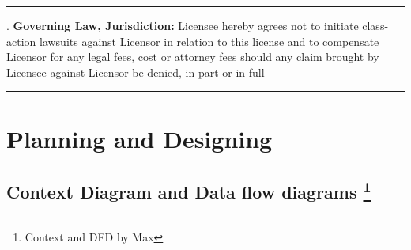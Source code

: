 \documentclass[oneside,openany,11pt,a4paper]{report}
\begin{document}
\noindent\rule{\textwidth}{0.5pt}
. \textbf{Governing Law, Jurisdiction:} Licensee hereby agrees not to initiate class-action lawsuits against Licensor in relation to this license and to compensate Licensor for any legal fees, cost or attorney fees should any claim brought by Licensee against Licensor be denied, in part or in full
\noindent\rule{\textwidth}{0.5pt}

\normalfont

\chapter{Planning and Designing}
\section[Context Data flow diagrams]{Context Diagram and Data flow diagrams \protect\footnote{Context and DFD by Max}}
\end{document}
